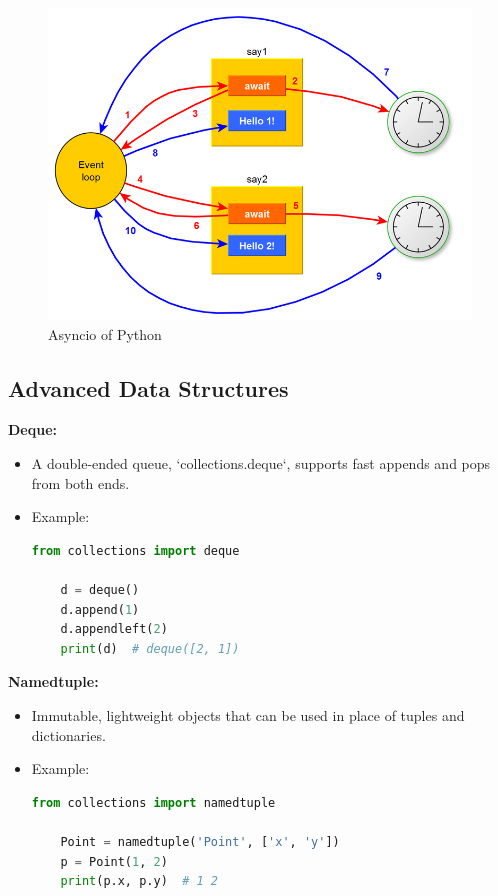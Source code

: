 \documentclass[12pt]{article}
\begin{document}
\begin{figure}[h!]
\begin{center}
\includegraphics[width=12.5cm]{advanced3.png}\\
Asyncio of Python
\end{center}
\end{figure}


\subsection{Advanced Data Structures}

\textbf{Deque:}
\begin{itemize}
    \item A double-ended queue, `collections.deque`, supports fast appends and pops from both ends.

    \item Example:\\
    \begin{lstlisting}[language = Python]
    from collections import deque

    d = deque()
    d.append(1)
    d.appendleft(2)
    print(d)  # deque([2, 1])
    \end{lstlisting}
    
\end{itemize}

\textbf{Namedtuple:}
\begin{itemize}
    \item Immutable, lightweight objects that can be used in place of tuples and dictionaries.

    \item Example:\\
    \begin{lstlisting}[language = Python]
    from collections import namedtuple

    Point = namedtuple('Point', ['x', 'y'])
    p = Point(1, 2)
    print(p.x, p.y)  # 1 2
    \end{lstlisting}
    
\end{itemize}
\end{document}
